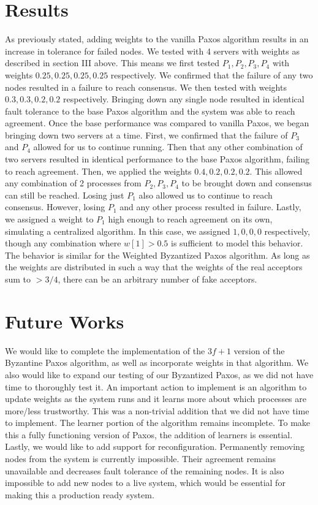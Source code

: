 \documentclass[conference]{IEEEtran}
\begin{document}
\section{Results}
As previously stated, adding weights to the vanilla Paxos algorithm results in an increase in tolerance for failed nodes. We tested with 4 servers with weights as described in section III above. This means we first tested ${P_1, P_2, P_3, P_4}$ with weights ${0.25, 0.25, 0.25, 0.25}$ respectively. We confirmed that the failure of any two nodes resulted in a failure to reach consensus. We then tested with weights ${0.3, 0.3, 0.2, 0.2}$ respectively. Bringing down any single node resulted in identical fault tolerance to the base Paxos algorithm and the system was able to reach agreement.
Once the base performance was compared to vanilla Paxos, we began bringing down two servers at a time. First, we confirmed that the failure of $P_3$ and $P_4$ allowed for us to continue running. Then that any other combination of two servers resulted in identical performance to the base Paxos algorithm, failing to reach agreement.
Then, we applied the weights ${0.4, 0.2, 0.2, 0.2}$. This allowed any combination of 2 processes from ${P_2, P_3, P_4}$ to be brought down and consensus can still be reached. Losing just $P_1$ also allowed us to continue to reach consensus. However, losing $P_1$ and any other process resulted in failure.
Lastly, we assigned a weight to $P_1$ high enough to reach agreement on its own, simulating a centralized algorithm. In this case, we assigned ${1, 0, 0, 0}$ respectively, though any combination where $w[1] > 0.5$ is sufficient to model this behavior.
The behavior is similar for the Weighted Byzantized Paxos algorithm. As long as the weights are distributed in such a way that the weights of the real acceptors sum to $> 3/4$, there can be an arbitrary number of fake acceptors.

\section{Future Works}
We would like to complete the implementation of the $3f + 1$ version of the Byzantine Paxos algorithm, as well as incorporate weights in that algorithm. We also would like to expand our testing of our Byzantized Paxos, as we did not have time to thoroughly test it.
An important action to implement is an algorithm to update weights as the system runs and it learns more about which processes are more/less trustworthy. This was a non-trivial addition that we did not have time to implement.
The learner portion of the algorithm remains incomplete. To make this a fully functioning version of Paxos, the addition of learners is essential.
Lastly, we would like to add support for reconfiguration. Permanently removing nodes from the system is currently impossible. Their agreement remains unavailable and decreases fault tolerance of the remaining nodes. It is also impossible to add new nodes to a live system, which would be essential for making this a production ready system.
\end{document}
